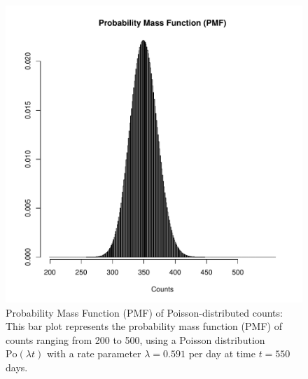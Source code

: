 \begin{figure}
\begin{knitrout}
\color{fgcolor}

{\centering \includegraphics[width=\textwidth-3cm]{figure/ch02_figunnamed-chunk-4-1} 

}


\end{knitrout}
  \caption{Probability Mass Function (PMF) of Poisson-distributed counts: This bar plot represents the probability mass function (PMF) of counts ranging from 200 to 500, using a Poisson distribution $\textrm{Po}(\lambda t)$ with a rate parameter $\lambda = 0.591$ per day at time $t = 550$ days.}
  \label{fig:2_3}
\end{figure}

